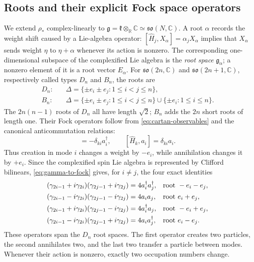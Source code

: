 \documentclass{article}
\theoremstyle{definition}
\theoremstyle{remark}
\newcommand{\C}{\mathbb C}
\newcommand{\R}{\mathbb R}
\begin{document}
\subsection{Roots and their explicit Fock space operators}
\label{sec:explicit-root-operators}

We extend $\rho_*$ complex-linearly to
$\mathfrak g=\mathfrak k\otimes_{\R}\C\simeq\mathfrak{so}(N,\C)$.
A root $\alpha$ records the weight shift caused by a Lie-algebra
operator: $[\widehat H_j,X_\alpha]=\alpha_jX_\alpha$ implies that
$X_\alpha$ sends weight $\eta$ to $\eta+\alpha$ whenever its action is
nonzero. The corresponding one-dimensional subspace of the complexified
Lie algebra is the \emph{root space} $\mathfrak g_\alpha$; a nonzero element
of it is a root vector $E_\alpha$. For $\mathfrak{so}(2n,\C)$ and $\mathfrak{so}(2n+1,\C)$,
respectively called types $D_n$ and $B_n$, the roots are
\begin{align}
 D_n:\quad&\Delta=\{\pm e_i\pm e_j:1\le i<j\le n\},
 \label{eq:roots-Dn}\\
 B_n:\quad&\Delta=\{\pm e_i\pm e_j:1\le i<j\le n\}
             \cup\{\pm e_i:1\le i\le n\}.
 \label{eq:roots-Bn}
\end{align}
The $2n(n-1)$ roots of $D_n$ all have length $\sqrt2$; $B_n$ adds the
$2n$ short roots of length one.
Their Fock operators follow from
\eqref{eq:cartan-observables} and the canonical anticommutation relations:
\begin{equation}
 [\widehat H_k,a_i^\dagger]=-\delta_{ki}a_i^\dagger,
 \qquad
 [\widehat H_k,a_i]=\delta_{ki}a_i.
\end{equation}
Thus creation in mode $i$ changes a weight by $-e_i$, while
annihilation changes it by $+e_i$.  Since the complexified spin Lie algebra
is represented by Clifford bilinears, \eqref{eq:gamma-to-fock} gives, for
$i\ne j$, the four exact identities
\begin{align}
 (\gamma_{2i-1}+i\gamma_{2i})
 (\gamma_{2j-1}+i\gamma_{2j})
 &=4a_i^\dagger a_j^\dagger,
 &&\text{root }-e_i-e_j,\notag\\
 (\gamma_{2i-1}-i\gamma_{2i})
 (\gamma_{2j-1}-i\gamma_{2j})
 &=4a_i a_j,
 &&\text{root }e_i+e_j,\notag\\
 (\gamma_{2i-1}+i\gamma_{2i})
 (\gamma_{2j-1}-i\gamma_{2j})
 &=4a_i^\dagger a_j,
 &&\text{root }-e_i+e_j,\notag\\
 (\gamma_{2i-1}-i\gamma_{2i})
 (\gamma_{2j-1}+i\gamma_{2j})
 &=4a_i a_j^\dagger,
 &&\text{root }e_i-e_j.
 \label{eq:Dn-root-operators}
\end{align}
These operators span the $D_n$ root spaces.
The first operator creates two particles, the second annihilates two, and
the last two transfer a particle between modes.  Whenever their action is
nonzero, exactly two occupation numbers change.
\end{document}
